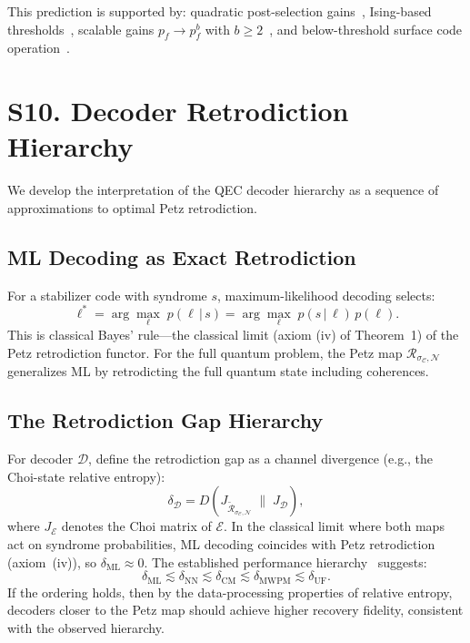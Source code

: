 \documentclass[prl,twocolumn,superscriptaddress,longbibliography]{revtex4-2}
\newcommand{\Petz}{\mathcal{R}}
\newcommand{\chan}{\mathcal{N}}
\newcommand{\code}{\mathcal{C}}
\begin{document}
This prediction is supported by: quadratic post-selection
gains~\cite{SmithBrownBartlett2024}, Ising-based
thresholds~\cite{EnglishWilliamsonBartlett2025}, scalable gains
$p_f \to p_f^b$ with $b \geq 2$~\cite{ChenEtAl2025}, and
below-threshold surface code operation~\cite{Acharya2025}.

\section{S10. Decoder Retrodiction Hierarchy}
\label{sec:decoder_hierarchy}

We develop the interpretation of the QEC decoder hierarchy as a
sequence of approximations to optimal Petz retrodiction.

\subsection{ML Decoding as Exact Retrodiction}

For a stabilizer code with syndrome $s$, maximum-likelihood decoding
selects:
\begin{equation}
\ell^* = \arg\max_\ell \; p(\ell \,|\, s)
= \arg\max_\ell \; p(s \,|\, \ell)\, p(\ell).
\end{equation}
This is classical Bayes' rule---the classical limit (axiom (iv) of
Theorem~1) of the Petz retrodiction functor. For the full quantum
problem, the Petz map $\Petz_{\sigma_\code,\chan}$ generalizes ML
by retrodicting the full quantum state including coherences.

\subsection{The Retrodiction Gap Hierarchy}

For decoder $\mathcal{D}$, define the retrodiction gap as a
channel divergence (e.g., the Choi-state relative entropy):
\begin{equation}
\delta_{\mathcal{D}} = D\!\left(J_{\tilde{\Petz}_{\sigma_\code,\chan}}
  \;\big\|\; J_{\mathcal{D}}\right),
\end{equation}
where $J_{\mathcal{E}}$ denotes the Choi matrix of $\mathcal{E}$.
In the classical limit where both maps act on syndrome
probabilities, ML decoding coincides with Petz retrodiction
(axiom~(iv)), so $\delta_{\mathrm{ML}} \approx 0$.
The established performance hierarchy~\cite{deMartiOlius2024}
suggests:
\begin{equation}
\delta_{\mathrm{ML}}
\lesssim \delta_{\mathrm{NN}}
\lesssim \delta_{\mathrm{CM}}
\lesssim \delta_{\mathrm{MWPM}}
\lesssim \delta_{\mathrm{UF}}.
\end{equation}
If the ordering holds, then by the data-processing properties
of relative entropy, decoders closer to the Petz map should
achieve higher recovery fidelity, consistent with the observed
hierarchy.
\end{document}
